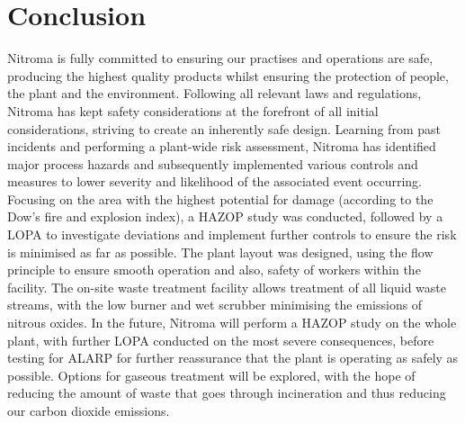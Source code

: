 \section{Conclusion}

Nitroma is fully committed to ensuring our practises and operations are safe, producing the highest quality products whilst ensuring the protection of people, the plant and the environment. Following all relevant laws and regulations, Nitroma has kept safety considerations at the forefront of all initial considerations, striving to create an inherently safe design. Learning from past incidents and performing a plant-wide risk assessment, Nitroma has identified major process hazards and subsequently implemented various controls and measures to lower severity and likelihood of the associated event occurring. Focusing on the area with the highest potential for damage (according to the Dow’s fire and explosion index), a HAZOP study was conducted, followed by a LOPA to investigate deviations and implement further controls to ensure the risk is minimised as far as possible. The plant layout was designed, using the flow principle to ensure smooth operation and also, safety of workers within the facility. The on-site waste treatment facility allows treatment of all liquid waste streams, with the low  burner and wet scrubber minimising the emissions of nitrous oxides. In the future, Nitroma will perform a HAZOP study on the whole plant, with further LOPA conducted on the most severe consequences, before testing for ALARP for further reassurance that the plant is operating as safely as possible. Options for gaseous treatment will be explored, with the hope of reducing the amount of waste that goes through incineration and thus reducing our carbon dioxide emissions. 